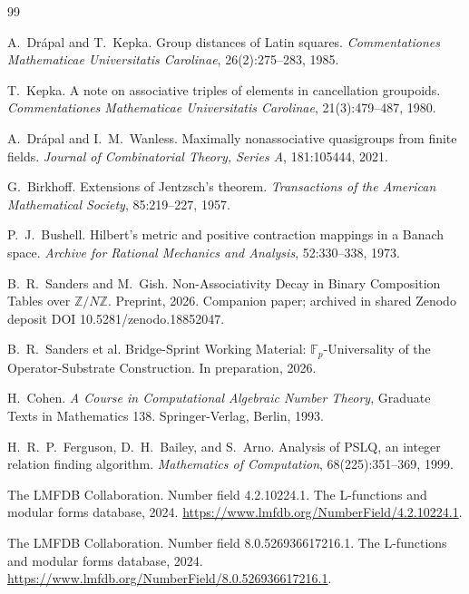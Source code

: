 \documentclass[11pt,reqno]{amsart}
\theoremstyle{plain}
\theoremstyle{definition}
\theoremstyle{remark}
\newcommand{\F}{\mathbb{F}}
\begin{document}
\begin{thebibliography}{99}

A.~Dr\'{a}pal and T.~Kepka.
\newblock Group distances of Latin squares.
\newblock \emph{Commentationes Mathematicae Universitatis Carolinae},
26(2):275--283, 1985.

T.~Kepka.
\newblock A note on associative triples of elements in cancellation groupoids.
\newblock \emph{Commentationes Mathematicae Universitatis Carolinae},
21(3):479--487, 1980.

A.~Dr\'{a}pal and I.~M.~Wanless.
\newblock Maximally nonassociative quasigroups from finite fields.
\newblock \emph{Journal of Combinatorial Theory, Series A},
181:105444, 2021.

G.~Birkhoff.
\newblock Extensions of {J}entzsch's theorem.
\newblock \emph{Transactions of the American Mathematical Society},
85:219--227, 1957.

P.~J.~Bushell.
\newblock Hilbert's metric and positive contraction mappings in a {Banach} space.
\newblock \emph{Archive for Rational Mechanics and Analysis},
52:330--338, 1973.

B.~R.~Sanders and M.~Gish.
\newblock Non-Associativity Decay in Binary Composition Tables over
$\mathbb{Z}/N\mathbb{Z}$.
\newblock Preprint, 2026.
\newblock Companion paper; archived in shared Zenodo deposit DOI
10.5281/zenodo.18852047.

B.~R.~Sanders et al.
\newblock Bridge-Sprint Working Material: $\F_{p}$-Universality of the
Operator-Substrate Construction.
\newblock In preparation, 2026.

H.~Cohen.
\newblock \emph{A Course in Computational Algebraic Number Theory},
Graduate Texts in Mathematics 138.
\newblock Springer-Verlag, Berlin, 1993.

H.~R.~P.~Ferguson, D.~H.~Bailey, and S.~Arno.
\newblock Analysis of {PSLQ}, an integer relation finding algorithm.
\newblock \emph{Mathematics of Computation}, 68(225):351--369, 1999.

The {LMFDB} Collaboration.
\newblock Number field 4.2.10224.1.
\newblock The {L}-functions and modular forms database, 2024.
\newblock \url{https://www.lmfdb.org/NumberField/4.2.10224.1}.

The {LMFDB} Collaboration.
\newblock Number field 8.0.526936617216.1.
\newblock The {L}-functions and modular forms database, 2024.
\newblock \url{https://www.lmfdb.org/NumberField/8.0.526936617216.1}.

\end{thebibliography}
\end{document}
